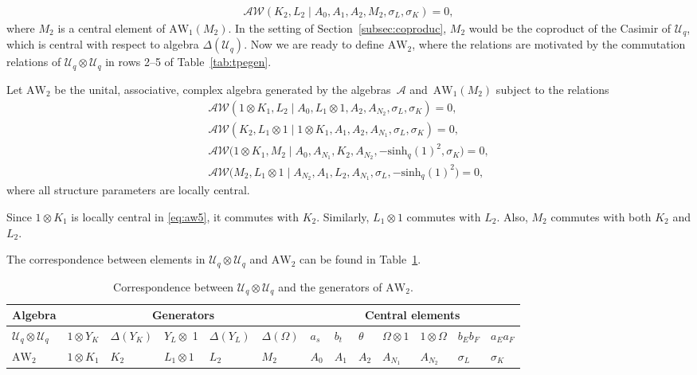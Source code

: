 \documentclass[10pt,a4paper]{amsart}
\numberwithin{equation}{section}
\newcommand{\awc}[2]{\mathrm{AW}_{#1}\!\left(#2\right)}
\newcommand{\AW}[1]{\mathrm{AW}_{#1}}
\newcommand{\awr}{\mathscr{A}\!\!\mathscr{W}}
\newcommand{\shq}{\mathrm{sinh}_q}
\newcommand{\Uq}{\mathcal{U}_q}
\begin{document}
\begin{gather}
	\awr(K_2,L_2\mid A_0,A_1,A_2,M_2,\sigma_L,\sigma_K)=0,\label{eq:aw1(M2)}
\end{gather}
where $M_2$ is a central element of $\awc{1}{M_2}$. In the setting of Section~\ref{subsec:coproduc}, $M_2$ would be the coproduct of the Casimir of $\Uq$, which is central with respect to algebra $\Delta(\Uq)$. Now we are ready to define $\AW{2}$, where the relations are motivated by the commutation relations of $\Uq\otimes\Uq$ in rows 2--5 of Table~\ref{tab:tpegen}.
\begin{Definition} \label{Def:AW2}
	Let $\AW{2}$ be the unital, associative, complex algebra generated by the algebras~$\mathscr{A}$ and~$\awc{1}{M_2}$ subject to the relations
	\begin{gather}
		\awr(1\otimes K_1,L_2\mid A_0,L_1\otimes 1,A_2,A_{N_2},\sigma_L,\sigma_K)=0,\label{eq:aw4}\\
		\awr(K_2,L_1\otimes 1\mid 1\otimes K_1,A_1,A_2,A_{N_1},\sigma_L,\sigma_K)=0,\label{eq:aw5}\\
		\awr\big(1\otimes K_1,M_2\mid A_0,A_{N_1},K_2,A_{N_2},-\shq(1)^{2},\sigma_K\big)=0,\label{eq:aw6}\\
		\awr\big(M_2,L_1\otimes 1\mid A_{N_2},A_1,L_2,A_{N_1},\sigma_L,-\shq(1)^{2}\big)=0,\label{eq:aw7}
	\end{gather}
	where all structure parameters are locally central.
\end{Definition}
\begin{Remark}
	Since $1\otimes K_1$ is locally central in \eqref{eq:aw5}, it commutes with $K_2$. Similarly, $L_1\otimes 1$ commutes with $L_2$. Also, $M_2$ commutes with both $K_2$ and $L_2$.
\end{Remark}
\noindent The correspondence between elements in $\Uq\otimes\Uq$ and $\AW{2}$ can be found in Table~\ref{tab:correspondenceuqaw}.
\begin{table}[h]\centering \renewcommand{\arraystretch}{1.2}\small
	\begin{tabular}{|@{\,\,}l@{\,\,}|l|l|l|l|l|l|l|l|l|l|l|l@{\,\,}|}
		\hline
		Algebra & \multicolumn{5}{c|}{Generators} & \multicolumn{7}{c|}{Central elements} \\ \hline
		$ \Uq \otimes \Uq $ &$ 1 \otimes Y_K $& $ \Delta(Y_K) $& $ Y_L\otimes $ 1& $ \Delta(Y_L) $& $ \Delta(\Omega) $& $ a_s $& $ b_t $& $ \theta $& $ \Omega \otimes 1$ & $ 1 \otimes \Omega $& $ b_Eb_F $& $ a_Ea_F $ \\ \hline
		$ \AW{2} $ & $ 1\otimes K_1 $ &$ K_2 $&$ L_1 \otimes 1 $&$ L_2 $& $ M_2 $& $ A_0 $& $ A_1 $& $ A_2 $& $ A_{N_1} $&$ A_{N_2} $&$ \sigma_L $&$ \sigma_K $ \\ \hline
	\end{tabular}
\caption{Correspondence between $\Uq\otimes\Uq$ and the generators of $\AW{2}$. }\label{tab:correspondenceuqaw}
\end{table}
\end{document}
